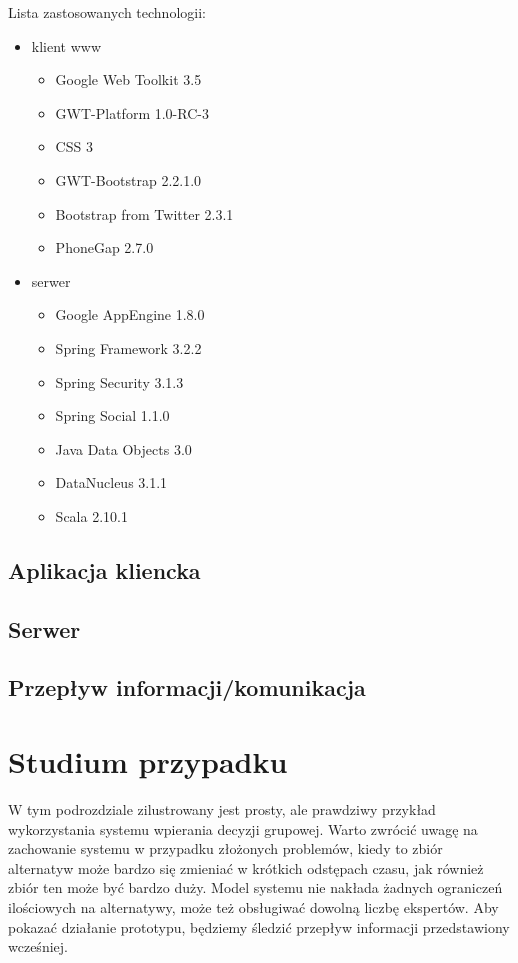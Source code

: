 Lista zastosowanych technologii:
\begin{itemize}
  
  \item klient www
  \begin{itemize}
    \item Google Web Toolkit 3.5
    \item GWT-Platform 1.0-RC-3
    \item CSS 3
    \item GWT-Bootstrap 2.2.1.0
    \item Bootstrap from Twitter 2.3.1
    \item PhoneGap 2.7.0
  \end{itemize}
  
  \item serwer
  \begin{itemize}
    \item Google AppEngine 1.8.0
    \item Spring Framework 3.2.2
    \item Spring Security 3.1.3
    \item Spring Social 1.1.0
    \item Java Data Objects 3.0
    \item DataNucleus 3.1.1
    \item Scala 2.10.1
  \end{itemize}
\end{itemize}

\subsection{Aplikacja kliencka}

\subsection{Serwer}

\subsection{Przepływ informacji/komunikacja}

\section{Studium przypadku}
W tym podrozdziale zilustrowany jest prosty, ale prawdziwy przykład
wykorzystania systemu wpierania decyzji grupowej. Warto zwrócić uwagę na
zachowanie systemu w przypadku złożonych problemów, kiedy to zbiór alternatyw
może bardzo się zmieniać w krótkich odstępach czasu, jak również zbiór ten może
być bardzo duży. Model systemu nie nakłada żadnych ograniczeń ilościowych na
alternatywy, może też obsługiwać dowolną liczbę ekspertów. Aby pokazać działanie
prototypu, będziemy śledzić przepływ informacji przedstawiony wcześniej.

